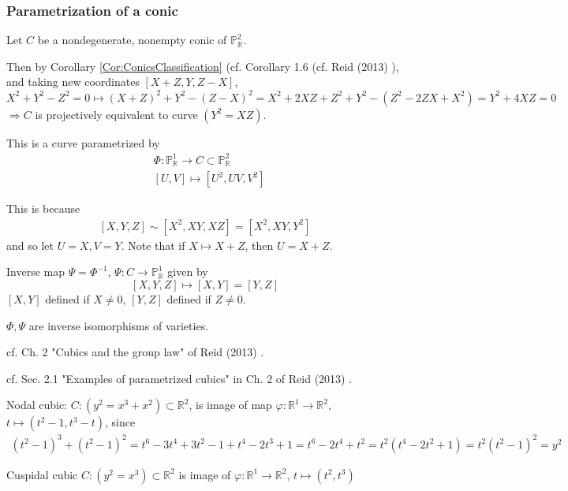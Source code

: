 \documentclass[10pt]{amsart}
\begin{document}
\begin{multicols*}{2}
\subsubsection{Parametrization of a conic}

Let $C$ be a nondegenerate, nonempty conic of $\mathbb{P}^2_{\mathbb{R}}$.

Then by Corollary \ref{Cor:ConicsClassification} (cf. Corollary 1.6 (cf. Reid (2013) \cite{Reid2013}), and taking new coordinates $[X+Z, Y, Z-X]$, 
\[
X^2 + Y^2-Z^2 = 0 \mapsto (X+Z)^2 + Y^2 - (Z-X)^2 = X^2 + 2XZ + Z^2 + Y^2 - (Z^2 - 2ZX + X^2) = Y^2 + 4XZ = 0
\]
$\Longrightarrow C$ is projectively equivalent to curve $(Y^2 =XZ)$.

This is a curve parametrized by 
\[
\begin{aligned} 
& \Phi : \mathbb{P}^1_{\mathbb{R}} \to C \subset \mathbb{P}^2_{\mathbb{R}} \\
& [U,V] \mapsto [ U^2, UV, V^2]
\end{aligned} 
\]

This is because 
\[
\begin{gathered}
	[X, Y, Z ] \sim [X^2 , XY , XZ ] = [X^2 , XY, Y^2]
\end{gathered}
\]
and so let $U=X, V=Y$.  Note that if $X \mapsto X+Z$, then $U=X+Z$.  

Inverse map $\Psi = \Phi^{-1}$, $\Psi : C \to \mathbb{P}^1_{\mathbb{R}}$ given by 
\[
[X,Y,Z] \mapsto [X,Y] = [Y,Z]
\]
$[X,Y]$ defined if $X \neq 0$, $[Y,Z]$ defined if $Z\neq 0$.

$\Phi, \Psi$ are inverse isomorphisms of varieties. 





cf. Ch. 2 "Cubics and the group law" of Reid (2013) \cite{Reid2013}.

cf. Sec. 2.1 "Examples of parametrized cubics" in Ch. 2 of Reid (2013) \cite{Reid2013}.

Nodal cubic: $C: (y^2 = x^3 + x^2) \subset \mathbb{R}^2$, is image of map $\varphi : \mathbb{R}^1 \to \mathbb{R}^2$, $t \mapsto (t^2 - 1, t^3 - t)$, since 
\[
\begin{gathered}
	(t^2 - 1)^3 + (t^2 - 1)^2 = t^6- 3t^4 + 3t^2  - 1 + t^4 - 2t^3 + 1 = t^6 - 2t^4 + t^2 = t^2 (t^4 - 2t^2 + 1) = t^2 (t^2 -1)^2 = y^2
\end{gathered}
\]

Cuspidal cubic 
$C : (y^2 = x^3) \subset \mathbb{R}^2$ is image of $\varphi: \mathbb{R}^1 \to \mathbb{R}^2$, $t\mapsto (t^2 , t^3)$


\end{multicols*}
\end{document}
